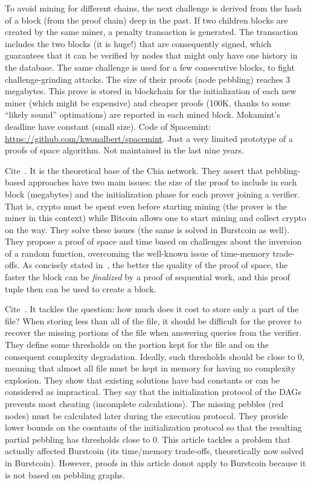 To avoid mining for different chains, the next challenge is derived from the hash of a block
(from the proof chain) deep in the past. If two children blocks are created by the same miner,
a penalty transaction is generated. The transaction includes the two blocks (it is huge!)
that are consequently signed, which guarantees that it can be verified by nodes that might
only have one history in the database.
The same challenge is used for a few consecutive blocks, to fight challenge-grinding attacks.
The size of their proofs (node pebbling) reaches 3 megabytes. This prove is stored in blockchain
for the initialization of each new miner (which might be expensive) and cheaper proofs
(100K, thanks to some ``likely sound'' optimations) are reported in each mined block.
Mokamint's deadline have constant (small size).
Code of Spacemint: \url{https://github.com/kwonalbert/spacemint}. Just a very limited prototype of a
proofs of space algorithm. Not maintained in the last nine years.

Cite~\cite{AbusalahACKPR17}. It is the theoretical base of the Chia network.
They assert that pebbling-based approaches have two main issues: the size of the proof to include in each block
(megabytes) and the initialization phase for each prover joining a verifier. That is, crypto must be spent even before
starting mining (the prover is the miner in this context) while Bitcoin allows one
to start mining and collect crypto on the way.
They solve these issues (the same is solved in Burstcoin as well).
They propose a proof of space and time based on challenges about the inversion of a random function,
overcoming the well-known issue of time-memory trade-offs.
As concisely stated in~\cite{ParkKFGAP18}, the better the quality of the proof of space, the faster the block can
be \emph{finalized} by a proof of sequential work, and this
proof tuple then can be used to create a block.

Cite~\cite{Reyzin23}. It tackles the question: how much does it cost to store only a part of the file?
When storing less than all of the file, it should be difficult for the prover to recover the
missing portions of the file when answering queries from the verifier. They define some thresholds
on the portion kept for the file and on the consequent complexity degradation. Ideally, such thresholds
should be close to 0, meaning that almost all file must be kept in memory for having no complexity
explosion. They show that existing solutions have bad constants or can be considered as impractical.
They say that the initialization protocol of the DAGs prevents most cheating (incomplete calculations).
The missing pebbles (red nodes) must be calculated later during the execution protocol.
They provide lower bounds on the cosntants of the initialization protocol so that
the resulting partial pebbling has thresholds close to 0.
This article tackles a problem that actually affected Burstcoin (its time/memory trade-offs,
theoretically now solved in Burstcoin). However, proofs in this article donot apply to Burstcoin
because it is not based on pebbling graphs.

